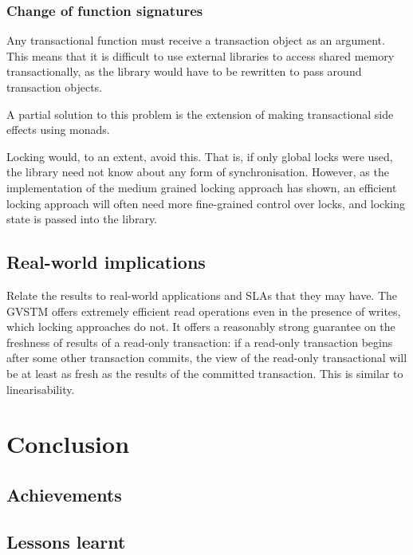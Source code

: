 \documentclass[12pt,a4paper,oneside,openright]{report}
\begin{document}
\subsection{Change of function signatures}
\label{sec:eval:change-funct-sign}

Any transactional function must receive a transaction object as an
argument. This means that it is difficult to use external libraries to
access shared memory transactionally, as the library would have to be
rewritten to pass around transaction objects.

A partial solution to this problem is the extension of making
transactional side effects using monads.

Locking would, to an extent, avoid this. That is, if only global locks
were used, the library need not know about any form of
synchronisation. However, as the implementation of the medium grained
locking approach has shown, an efficient locking approach will often
need more fine-grained control over locks, and locking state is passed
into the library.

\section{Real-world implications}
\label{sec:eval:real-world-impl}

Relate the results to real-world applications and SLAs that they may
have. The GVSTM offers extremely efficient read operations even in the
presence of writes, which locking approaches do not. It offers a
reasonably strong guarantee on the freshness of results of a read-only
transaction: if a read-only transaction begins after some other
transaction commits, the view of the read-only transactional will be
at least as fresh as the results of the committed transaction. This is
similar to linearisability.


\chapter{Conclusion}

\section{Achievements}
\label{sec:conc:achievements}

\section{Lessons learnt}
\label{sec:conc:lessons-learnt}
\end{document}
